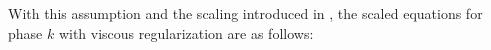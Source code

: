 \documentclass[preprint,10pt]{elsarticle}
\begin{document}
With this assumption and the scaling introduced in , the scaled equations for phase $k$ with viscous regularization are as follows:
% 
\end{document}
